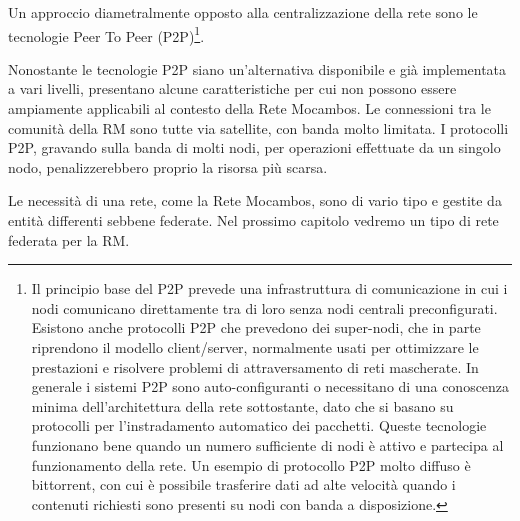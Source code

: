 Un approccio diametralmente opposto alla centralizzazione della rete
sono le tecnologie Peer To Peer (P2P)\footnote{Il principio base del
  P2P prevede una infrastruttura di comunicazione in cui i nodi
  comunicano direttamente tra di loro senza nodi centrali
  preconfigurati. Esistono anche protocolli P2P che prevedono dei
  super-nodi, che in parte riprendono il modello client/server,
  normalmente usati per ottimizzare le prestazioni e risolvere
  problemi di attraversamento di reti mascherate. In generale i
  sistemi P2P sono auto-configuranti o necessitano di una conoscenza
  minima dell'architettura della rete sottostante, dato che si basano
  su protocolli per l'instradamento automatico dei pacchetti. Queste
  tecnologie funzionano bene quando un numero sufficiente di nodi è
  attivo e partecipa al funzionamento della rete. Un esempio di
  protocollo P2P molto diffuso è bittorrent, con cui è possibile
  trasferire dati ad alte velocità quando i contenuti richiesti sono
  presenti su nodi con banda a disposizione.}.

Nonostante le tecnologie P2P siano un'alternativa disponibile e già
implementata a vari livelli, presentano alcune caratteristiche per cui
non possono essere ampiamente applicabili al contesto della Rete
Mocambos. Le connessioni tra le comunità della RM sono tutte via
satellite, con banda molto limitata. I protocolli P2P, gravando sulla
banda di molti nodi, per operazioni effettuate da un singolo nodo,
penalizzerebbero proprio la risorsa più scarsa. 

Le necessità di una rete, come la Rete Mocambos, sono di vario tipo e
gestite da entità differenti sebbene federate. Nel prossimo capitolo
vedremo un tipo di rete federata per la RM.

